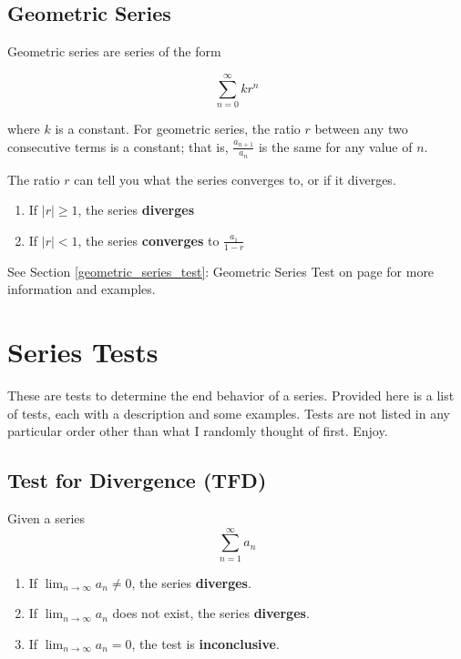 \documentclass[12pt]{report}
\begin{document}
\clearpage


\section{Geometric Series}
Geometric series are series of the form 

    $$ \sum_{n=0}^{\infty} kr^n $$

where $k$ is a constant. For geometric series, the ratio $r$ between any two consecutive terms is a constant; that is, $ \frac{a_{n+1}}{a_n} $ is the same for any value of $n$.

The ratio $r$ can tell you what the series converges to, or if it diverges.
\begin{enumerate}
    \item If $|r| \geq 1$, the series \textbf{diverges}
    \item If $|r| < 1$, the series \textbf{converges} to $\frac{a_1}{1-r}$
\end{enumerate}
See Section \ref{geometric_series_test}: Geometric Series Test on page \pageref{geometric_series_test} for more information and examples.




\clearpage











\chapter{Series Tests}
These are tests to determine the end behavior of a series. Provided here is a list of tests, each with a description and some examples. Tests are not listed in any particular order other than what I randomly thought of first. Enjoy.




\section{Test for Divergence (TFD)}
Given a series
    $$\sum_{n=1}^\infty a_n$$

\begin{enumerate}
	\item If $ \lim_{n\to\infty} a_n \neq 0 $, the series \textbf{diverges}.
	\item If $ \lim_{n\to\infty} a_n $ does not exist, the series \textbf{diverges}.
	\item If $ \lim_{n\to\infty} a_n = 0 $, the test is \textbf{inconclusive}.
\end{enumerate}
\end{document}
